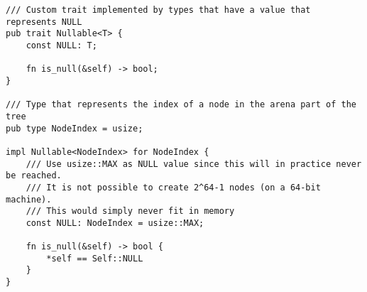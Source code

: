 \begin{verbatim}
/// Custom trait implemented by types that have a value that represents NULL
pub trait Nullable<T> {
    const NULL: T;

    fn is_null(&self) -> bool;
}

/// Type that represents the index of a node in the arena part of the tree
pub type NodeIndex = usize;

impl Nullable<NodeIndex> for NodeIndex {
    /// Use usize::MAX as NULL value since this will in practice never be reached.
    /// It is not possible to create 2^64-1 nodes (on a 64-bit machine).
    /// This would simply never fit in memory
    const NULL: NodeIndex = usize::MAX;

    fn is_null(&self) -> bool {
        *self == Self::NULL
    }
}
\end{verbatim}

